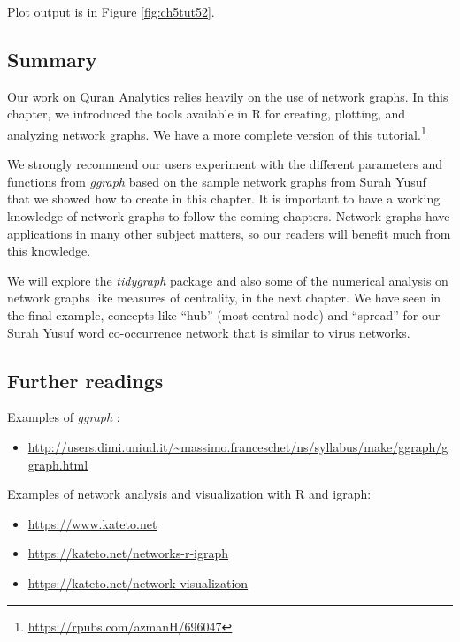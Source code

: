 \documentclass[
]{article}
\providecommand{\tightlist}{%
  \setlength{\itemsep}{0pt}\setlength{\parskip}{0pt}}
\begin{document}
Plot output is in Figure \ref{fig:ch5tut52}.

\hypertarget{chapter-5-summary}{%
\subsection{Summary}\label{chapter-5-summary}}

Our work on Quran Analytics relies heavily on the use of network graphs. In this chapter, we introduced the tools available in R for creating, plotting, and analyzing network graphs. We have a more complete version of this tutorial.\footnote{\url{https://rpubs.com/azmanH/696047}}

We strongly recommend our users experiment with the different parameters and functions from \emph{ggraph} based on the sample network graphs from Surah Yusuf that we showed how to create in this chapter. It is important to have a working knowledge of network graphs to follow the coming chapters. Network graphs have applications in many other subject matters, so our readers will benefit much from this knowledge.

We will explore the \emph{tidygraph} package and also some of the numerical analysis on network graphs like measures of centrality, in the next chapter. We have seen in the final example, concepts like ``hub'' (most central node) and ``spread'' for our Surah Yusuf word co-occurrence network that is similar to virus networks.

\hypertarget{further-readings-4}{%
\subsection{Further readings}\label{further-readings-4}}

Examples of \emph{ggraph} :

\begin{itemize}
\tightlist
\item
  \url{http://users.dimi.uniud.it/~massimo.franceschet/ns/syllabus/make/ggraph/ggraph.html}
\end{itemize}

Examples of network analysis and visualization with R and igraph:

\begin{itemize}
\tightlist
\item
  \url{https://www.kateto.net}
\item
  \url{https://kateto.net/networks-r-igraph}
\item
  \url{https://kateto.net/network-visualization}
\end{itemize}
\end{document}
